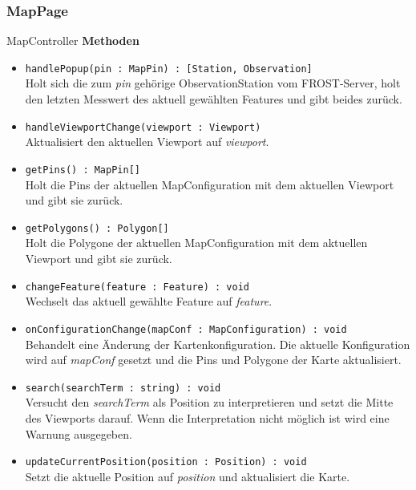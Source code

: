 \subsubsection{MapPage}
\begin{Class}{MapController}
    \textbf{Methoden}
    \begin{itemize}
        \item \texttt{handlePopup(pin : MapPin) : [Station, Observation]}
        \\ Holt sich die zum \emph{pin} gehörige ObservationStation vom FROST-Server,
        holt den letzten Messwert des aktuell gewählten Features und gibt beides zurück.
        \item \texttt{handleViewportChange(viewport : Viewport)}
        \\ Aktualisiert den aktuellen Viewport auf \emph{viewport}.

        \bigskip
        \item \texttt{getPins() : MapPin[]}
        \\ Holt die Pins der aktuellen MapConfiguration mit dem aktuellen Viewport 
        und gibt sie zurück.
        \item \texttt{getPolygons() : Polygon[]}
        \\ Holt die Polygone der aktuellen MapConfiguration mit dem aktuellen Viewport 
        und gibt sie zurück.

        \bigskip
        \item \texttt{changeFeature(feature : Feature) : void}
        \\ Wechselt das aktuell gewählte Feature auf \emph{feature}.
        \item \texttt{onConfigurationChange(mapConf : MapConfiguration) : void}
        \\ Behandelt eine Änderung der Kartenkonfiguration.
        Die aktuelle Konfiguration wird auf \emph{mapConf} gesetzt und die Pins und Polygone der Karte aktualisiert.
        \item \texttt{search(searchTerm : string) : void}
        \\ Versucht den \emph{searchTerm} als Position zu interpretieren und setzt die Mitte des Viewports darauf.
        Wenn die Interpretation nicht möglich ist wird eine Warnung ausgegeben.
        \item \texttt{updateCurrentPosition(position : Position) : void}
        \\ Setzt die aktuelle Position auf \emph{position} und aktualisiert die Karte.
    \end{itemize}
\end{Class}

